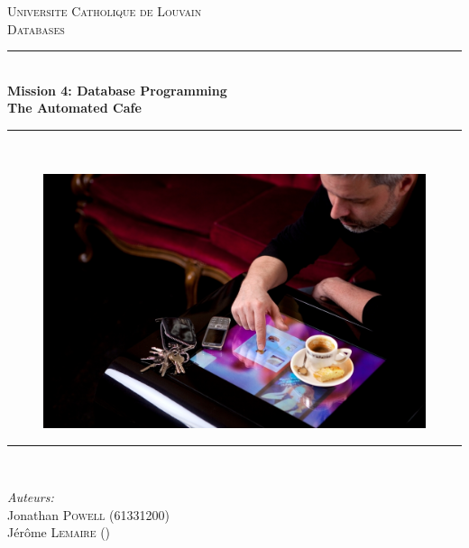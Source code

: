 \documentclass[a4paper,10pt]{article}
\newcommand{\HRule}{\rule{\linewidth}{0.5mm}}
\begin{document}
\begin{titlepage}

  \begin{center}


    \textsc{\Large Universite Catholique de Louvain}\\[1cm]

    \textsc{\LARGE{Databases}}\\[1cm]


    \HRule \\[0.35cm]
    {\huge \bfseries Mission 4: Database Programming \\ The Automated Cafe}\\
    \HRule \\[0.35cm]
        \end{center}
      \begin{figure}[h!]
      \begin{center}
       \includegraphics[scale=0.6]{restaurant.jpg}
      \end{center}
      \end{figure}

    \begin{center}
    \HRule \\[0.2cm]
  \end{center}

    \begin{minipage}{0.48\textwidth}
      \begin{flushleft} \large
        \textit{Auteurs:}\\
        Jonathan \textsc{Powell} (61331200)\\ \vspace{0.3cm}
        Jérôme \textsc{Lemaire} ()\\ \vspace{0.3cm}


\end{flushleft}
\end{minipage}
\end{titlepage}
\end{document}
